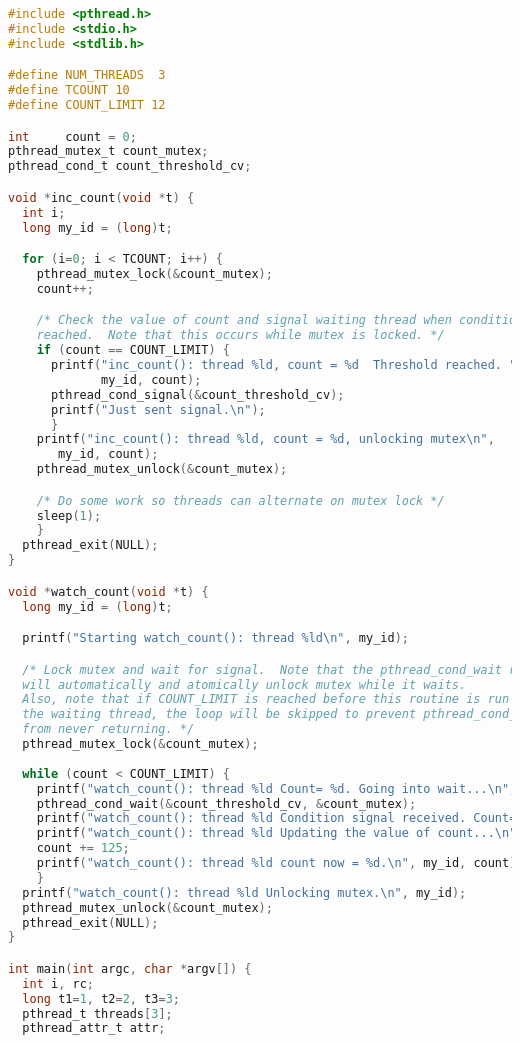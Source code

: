 \begin{lstlisting}[language=C]
#include <pthread.h>
#include <stdio.h>
#include <stdlib.h>

#define NUM_THREADS  3
#define TCOUNT 10
#define COUNT_LIMIT 12

int     count = 0;
pthread_mutex_t count_mutex;
pthread_cond_t count_threshold_cv;

void *inc_count(void *t) {
  int i;
  long my_id = (long)t;

  for (i=0; i < TCOUNT; i++) {
    pthread_mutex_lock(&count_mutex);
    count++;

    /* Check the value of count and signal waiting thread when condition is
    reached.  Note that this occurs while mutex is locked. */
    if (count == COUNT_LIMIT) {
      printf("inc_count(): thread %ld, count = %d  Threshold reached. ",
             my_id, count);
      pthread_cond_signal(&count_threshold_cv);
      printf("Just sent signal.\n");
      }
    printf("inc_count(): thread %ld, count = %d, unlocking mutex\n", 
       my_id, count);
    pthread_mutex_unlock(&count_mutex);

    /* Do some work so threads can alternate on mutex lock */
    sleep(1);
    }
  pthread_exit(NULL);
}

void *watch_count(void *t) {
  long my_id = (long)t;

  printf("Starting watch_count(): thread %ld\n", my_id);

  /* Lock mutex and wait for signal.  Note that the pthread_cond_wait routine
  will automatically and atomically unlock mutex while it waits. 
  Also, note that if COUNT_LIMIT is reached before this routine is run by
  the waiting thread, the loop will be skipped to prevent pthread_cond_wait
  from never returning. */
  pthread_mutex_lock(&count_mutex);
  
  while (count < COUNT_LIMIT) {
    printf("watch_count(): thread %ld Count= %d. Going into wait...\n", my_id,count);
    pthread_cond_wait(&count_threshold_cv, &count_mutex);
    printf("watch_count(): thread %ld Condition signal received. Count= %d\n", my_id,count);
    printf("watch_count(): thread %ld Updating the value of count...\n", my_id,count);
    count += 125;
    printf("watch_count(): thread %ld count now = %d.\n", my_id, count);
    }
  printf("watch_count(): thread %ld Unlocking mutex.\n", my_id);
  pthread_mutex_unlock(&count_mutex);
  pthread_exit(NULL);
}

int main(int argc, char *argv[]) {
  int i, rc; 
  long t1=1, t2=2, t3=3;
  pthread_t threads[3];
  pthread_attr_t attr;


\end{lstlisting}
